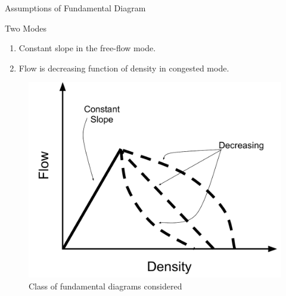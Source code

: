 \documentclass[xcolor=svgnames, english, smaller]{beamer}
\theoremstyle{plain}
\theoremstyle{definition}
\theoremstyle{plain}
\theoremstyle{plain}
\begin{document}
\begin{frame}{Assumptions of Fundamental Diagram}
\begin{block}
{Two Modes}
\begin{enumerate}
\item <1->Constant slope in the free-flow mode.
\item <2->Flow is decreasing function of density in congested mode.
\end{enumerate}
\end{block}

\begin{figure}
\begin{centering}
\includegraphics[scale=0.25]{../../figures/presentation/AnnotatedFundamentalDiagram}
\par\end{centering}
\caption{Class of fundamental diagrams considered}
\end{figure}



\end{frame}
\end{document}
